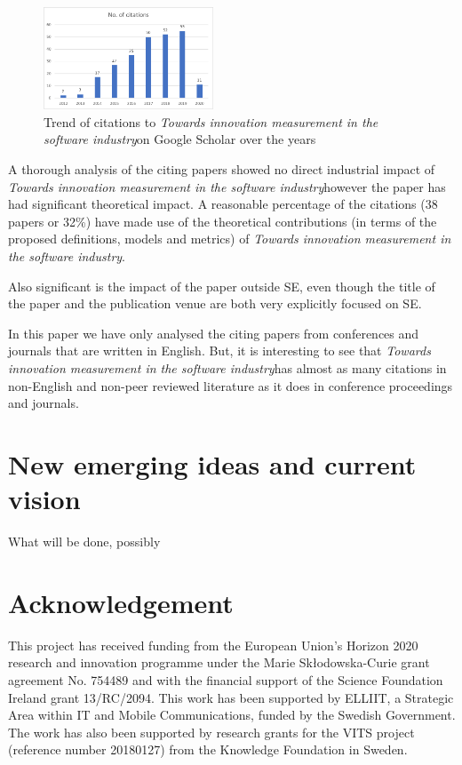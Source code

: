 \documentclass[sigplan]{acmart}
\newcommand{\theArticle}{\textit{Towards innovation measurement in the software industry}}
\begin{document}
{\begin{figure}[htbp]
	\begin{center}
		\includegraphics[width=0.45\textwidth,height=\textheight,keepaspectratio]{Figures/CitationsTrend.pdf}
	\end{center}
	\caption{Trend of citations to \theArticle on Google Scholar over the years}
	\label{fig:citationTrend}
\end{figure}

A thorough analysis of the citing papers showed no direct industrial impact of \theArticle however the paper has had significant theoretical impact. A reasonable percentage of the citations (38 papers or 32\%) have made use of the theoretical contributions (in terms of the proposed definitions, models and metrics) of \theArticle. 

Also significant is the impact of the paper outside SE, even though the title of the paper and the publication venue are both very explicitly focused on SE.

In this paper we have only analysed the citing papers from conferences and journals that are written in English. But, it is interesting to see that \theArticle has almost as many citations in non-English and non-peer reviewed literature as it does in conference proceedings and journals. 

\section{New emerging ideas and current vision}\label{sec:fw} 
What will be done, possibly

\section*{Acknowledgement}
This project has received funding from the European Union's Horizon 2020 research and innovation programme under the Marie Skłodowska-Curie grant agreement No. 754489 and with the financial support of the Science Foundation Ireland grant 13/RC/2094. This work has been supported by ELLIIT, a Strategic Area within IT and Mobile Communications, funded by the Swedish Government. The work has also been supported by research grants for the VITS project (reference number 20180127) from the Knowledge Foundation in Sweden.

}
\end{document}

